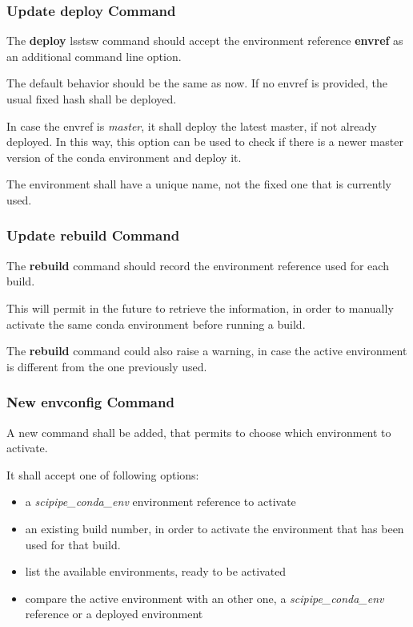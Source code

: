 \subsubsection{Update deploy Command} \label{sec:deploy}

The \textbf{deploy} lsstsw command should accept the environment reference \textbf{envref}  as an additional command line option.

The default behavior should be the same as now. If no envref is provided, the usual fixed hash shall be deployed. 

In case the envref is \textit{master}, it shall deploy the latest master, if not already deployed.
In this way, this option can be used to check if there is a newer master version of the conda environment and deploy it.

The environment shall have a unique name, not the fixed one that is currently used.


\subsubsection{Update rebuild Command} \label{sec:rebuild}

The \textbf{rebuild} command should record the environment reference used for each build.

This will permit in the future to retrieve the information, in order to manually activate the same conda environment before running a build.

The \textbf{rebuild} command could also raise a warning, in case the active environment is different from the one previously used.


\subsubsection{New envconfig Command} \label{sec:envconfig}

A new command shall be added, that permits to choose which environment to activate.

It shall accept one of following options:

\begin{itemize}
\item a \textit{scipipe\_conda\_env} environment reference to activate
\item an existing build number, in order to activate the environment that has been used for that build.
\item list the available environments, ready to be activated
\item compare the active environment with an other one, a \textit{scipipe\_conda\_env} reference or a deployed environment
\end{itemize}

